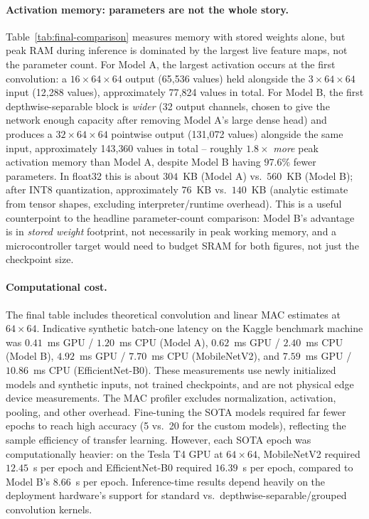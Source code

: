 \documentclass[11pt]{article}
\begin{document}
\paragraph{Activation memory: parameters are not the whole story.} Table~\ref{tab:final-comparison}
measures memory with stored weights alone, but peak RAM during inference is
dominated by the largest live feature maps, not the parameter count. For
Model A, the largest activation occurs at the first convolution: a
$16\times64\times64$ output (65{,}536 values) held alongside the
$3\times64\times64$ input (12{,}288 values), approximately 77{,}824 values
in total. For Model B, the first depthwise-separable block is \emph{wider}
(32 output channels, chosen to give the network enough capacity after
removing Model A's large dense head) and produces a $32\times64\times64$
pointwise output (131{,}072 values) alongside the same input, approximately
143{,}360 values in total -- roughly $1.8\times$ \emph{more} peak activation
memory than Model A, despite Model B having $97.6\%$ fewer parameters. In
float32 this is about $304$~KB (Model A) vs.\ $560$~KB (Model B); after INT8
quantization, approximately $76$~KB vs.\ $140$~KB (analytic estimate from
tensor shapes, excluding interpreter/runtime overhead). This is a useful
counterpoint to the headline parameter-count comparison: Model B's advantage
is in \emph{stored weight} footprint, not necessarily in peak working
memory, and a microcontroller target would need to budget SRAM for both
figures, not just the checkpoint size.

\paragraph{Computational cost.} The final table includes theoretical
convolution and linear MAC estimates at $64\times64$. Indicative synthetic
batch-one latency on the Kaggle benchmark machine was $0.41$~ms GPU / $1.20$~ms CPU (Model A),
$0.62$~ms GPU / $2.40$~ms CPU (Model B), $4.92$~ms GPU / $7.70$~ms CPU (MobileNetV2), and
$7.59$~ms GPU / $10.86$~ms CPU (EfficientNet-B0).
These measurements use newly initialized models and synthetic inputs, not
trained checkpoints, and are not physical edge device measurements. The MAC
profiler excludes normalization, activation, pooling, and other overhead.
Fine-tuning the SOTA models required far
fewer epochs to reach high accuracy (5 vs.\ 20 for the custom models),
reflecting the sample efficiency of transfer learning. However, each SOTA
epoch was computationally heavier: on the Tesla T4 GPU at $64\times64$, MobileNetV2 required
$12.45$~s per epoch and EfficientNet-B0 required $16.39$~s per epoch,
compared to Model B's $8.66$~s per epoch. Inference-time results depend heavily on the deployment hardware's support for
standard vs.\ depthwise-separable/grouped convolution kernels.
\end{document}
